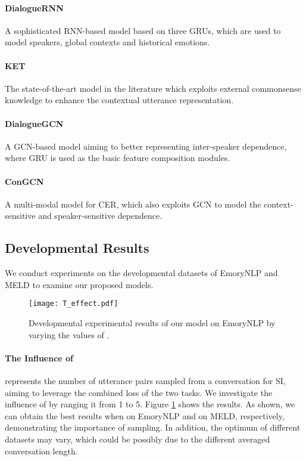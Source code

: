 \documentclass{article}
\begin{document}
\begin{CJK}{UTF8}{gbsn}
\paragraph{DialogueRNN} \cite{majumder2019dialoguernn} A sophisticated RNN-based model based on three GRUs, which are used to model speakers, global contexts and historical emotions.

\paragraph{KET} \cite{zhong2019knowledge} The state-of-the-art model in the literature which exploits external commonsense knowledge to enhance the contextual utterance representation. 

\paragraph{DialogueGCN} \cite{ghosal2019dialoguegcn} A GCN-based model aiming to better representing  inter-speaker dependence, where GRU is used as the basic feature composition modules.

\paragraph{ConGCN} \cite{zhang2019Modeling} A multi-modal model for CER, which also exploits GCN to model the context-sensitive and speaker-sensitive dependence. 

\subsection{Developmental Results}
We conduct  experiments on the developmental datasets of EmoryNLP and MELD to examine our proposed models.



\begin{figure}[t]
\centering
\texttt{[image: T\_effect.pdf]}
	\caption{Developmental experimental results of our model on EmoryNLP by varying the values of .}
\label{figure_T}
\end{figure}





\paragraph{The Influence of  }
 represents the number of utterance pairs sampled from a conversation for SI,
aiming to leverage the combined loss of the two tasks.
We investigate the influence of  by ranging it from 1 to 5. 
Figure \ref{figure_T} shows the results.
As shown, we can obtain the best results when  on EmoryNLP and  on MELD, respectively,
demonstrating the importance of sampling.
In addition, the optimum  of different datasets may vary, which could be possibly due to the different averaged conversation length.












\end{CJK}
\end{document}
